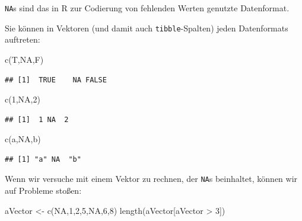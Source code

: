 \documentclass[
]{book}
\newenvironment{Shaded}{\begin{snugshade}}{\end{snugshade}}
\newcommand{\ConstantTok}[1]{\textcolor[rgb]{0.00,0.00,0.00}{#1}}
\newcommand{\DecValTok}[1]{\textcolor[rgb]{0.00,0.00,0.81}{#1}}
\newcommand{\FunctionTok}[1]{\textcolor[rgb]{0.00,0.00,0.00}{#1}}
\newcommand{\NormalTok}[1]{#1}
\newcommand{\OtherTok}[1]{\textcolor[rgb]{0.56,0.35,0.01}{#1}}
\newcommand{\SpecialCharTok}[1]{\textcolor[rgb]{0.00,0.00,0.00}{#1}}
\newcommand{\StringTok}[1]{\textcolor[rgb]{0.31,0.60,0.02}{#1}}
\begin{document}
\texttt{NA}s sind das in R zur Codierung von fehlenden Werten genutzte Datenformat.

Sie können in Vektoren (und damit auch \texttt{tibble}-Spalten) jeden Datenformats auftreten:

\begin{Shaded}
\begin{Highlighting}[]
\FunctionTok{c}\NormalTok{(T,}\ConstantTok{NA}\NormalTok{,F)}
\end{Highlighting}
\end{Shaded}

\begin{verbatim}
## [1]  TRUE    NA FALSE
\end{verbatim}

\begin{Shaded}
\begin{Highlighting}[]
\FunctionTok{c}\NormalTok{(}\DecValTok{1}\NormalTok{,}\ConstantTok{NA}\NormalTok{,}\DecValTok{2}\NormalTok{)}
\end{Highlighting}
\end{Shaded}

\begin{verbatim}
## [1]  1 NA  2
\end{verbatim}

\begin{Shaded}
\begin{Highlighting}[]
\FunctionTok{c}\NormalTok{(}\StringTok{\textquotesingle{}a\textquotesingle{}}\NormalTok{,}\ConstantTok{NA}\NormalTok{,}\StringTok{\textquotesingle{}b\textquotesingle{}}\NormalTok{)}
\end{Highlighting}
\end{Shaded}

\begin{verbatim}
## [1] "a" NA  "b"
\end{verbatim}

Wenn wir versuche mit einem Vektor zu rechnen, der \texttt{NA}s beinhaltet, können wir auf Probleme stoßen:

\begin{Shaded}
\begin{Highlighting}[]
\NormalTok{aVector }\OtherTok{\textless{}{-}} \FunctionTok{c}\NormalTok{(}\ConstantTok{NA}\NormalTok{,}\DecValTok{1}\NormalTok{,}\DecValTok{2}\NormalTok{,}\DecValTok{5}\NormalTok{,}\ConstantTok{NA}\NormalTok{,}\DecValTok{6}\NormalTok{,}\DecValTok{8}\NormalTok{)}
\FunctionTok{length}\NormalTok{(aVector[aVector }\SpecialCharTok{\textgreater{}} \DecValTok{3}\NormalTok{])}
\end{Highlighting}
\end{Shaded}
\end{document}
